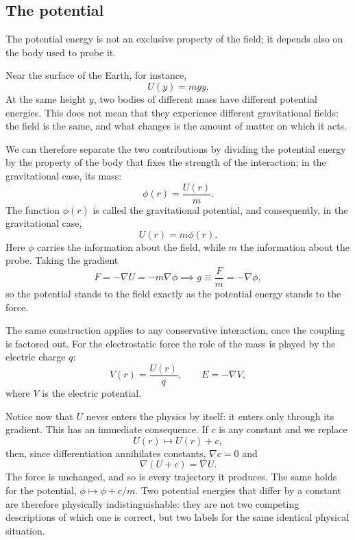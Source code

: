 \newpage\newpage
\subsection{The potential}

The potential energy is not an exclusive property of the field; it depends also on the
body used to probe it.

Near the surface of the Earth, for instance,
\[
	U(y) = mgy.
\]
At the same height \(y\), two bodies of different mass have different potential energies.
This does not mean that they experience different gravitational fields: the field is
the same, and what changes is the amount of matter on which it acts.

We can therefore separate the two contributions by dividing the potential energy
by the property of the body that fixes the strength of the interaction; in the
gravitational case, its mass:
\[
	\phi(r) = \frac{U(r)}{m}.
\]
The function \(\phi(r)\) is called the gravitational potential, and consequently,
in the gravitational case,
\[
	U(r) = m \phi(r).
\]
Here \(\phi\) carries the information about the field, while \(m\) the information
about the probe. Taking the gradient
\[
	F = - \nabla U = -m \nabla \phi \implies g \equiv \frac{F}{m} = - \nabla \phi,
\]
so the potential stands to the field exactly as the potential energy stands to the
force.

The same construction applies to any conservative interaction, once the coupling is
factored out. For the electrostatic force the role of the mass is played by the
electric charge \(q\):
\[
	V(r) = \frac{U(r)}{q}, \qquad E = - \nabla V,
\]
where \(V\) is the electric potential.


Notice now that \(U\) never enters the physics by itself: it enters only
through its gradient. This has an immediate consequence. If \(c\) is any constant
and we replace
\[
	U(r) \mapsto U(r) + c,
\]
then, since differentiation annihilates constants, \(\nabla c = 0\) and
\[
	\nabla (U + c) = \nabla U.
\]
The force is unchanged, and so is every trajectory it produces. The same holds for
the potential, \(\phi \mapsto \phi + c/m\). Two potential energies that differ by a
constant are therefore physically indistinguishable: they are not two competing
descriptions of which one is correct, but two labels for the same identical physical
situation.
